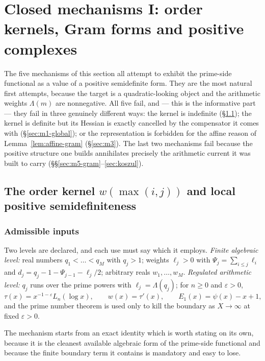 \documentclass[11pt]{amsart}
\theoremstyle{definition}
\theoremstyle{remark}
\theoremstyle{definition}
\newcommand{\eps}{\varepsilon}
\begin{document}
\section{Closed mechanisms I: order kernels, Gram forms and positive complexes}
\label{sec:mech-gram}

The five mechanisms of this section all attempt to exhibit the prime-side functional as a value
of a positive semidefinite form. They are the most natural first attempts, because the target is
a quadratic-looking object and the arithmetic weights $\Lambda(m)$ are nonnegative. All five
fail, and --- this is the informative part --- they fail in three genuinely different ways: the
kernel is indefinite (\S\ref{sec:m1-local}); the kernel is definite but its Hessian is exactly
cancelled by the compensator it comes with (\S\ref{sec:m1-global}); or the representation is
forbidden for the affine reason of Lemma~\ref{lem:affine-gram} (\S\ref{sec:m3}). The last two
mechanisms fail because the positive structure one builds annihilates precisely the arithmetic
current it was built to carry (\S\S\ref{sec:m5-gram}--\ref{sec:koszul}).

\subsection{The order kernel $w(\max(i,j))$ and local positive semidefiniteness}
\label{sec:m1-local}

\subsubsection*{Admissible inputs}
Two levels are declared, and each use must say which it employs.
\emph{Finite algebraic level:} real numbers $q_1<\dots<q_M$ with $q_j>1$; weights $\ell_j>0$
with $\Psi_j=\sum_{i\le j}\ell_i$ and $d_j=q_j-1-\Psi_{j-1}-\ell_j/2$; arbitrary reals
$w_1,\dots,w_M$. \emph{Regulated arithmetic level:} $q_j$ runs over the prime powers with
$\ell_j=\Lambda(q_j)$; for $n\ge0$ and $\eps>0$,
\begin{equation}\label{eq:tau}
   \tau(x)=x^{-1-\eps}L_n(\log x),\qquad w(x)=\tau'(x),\qquad E_1(x)=\psi(x)-x+1 ,
\end{equation}
and the prime number theorem is used only to kill the boundary as $X\to\infty$ at fixed
$\eps>0$.

The mechanism starts from an exact identity which is worth stating on its own, because it is the
cleanest available algebraic form of the prime-side functional and because the finite boundary
term it contains is mandatory and easy to lose.
\end{document}

